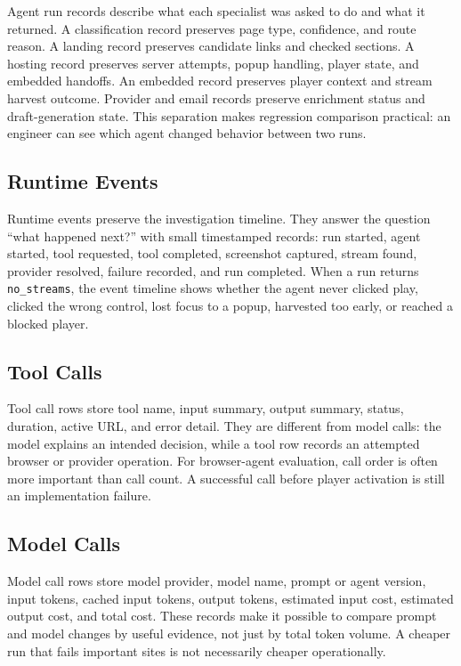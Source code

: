 Agent run records describe what each specialist was asked to do and what it
returned. A classification record preserves page type, confidence, and route
reason. A landing record preserves candidate links and checked sections. A
hosting record preserves server attempts, popup handling, player state, and
embedded handoffs. An embedded record preserves player context and stream
harvest outcome. Provider and email records preserve enrichment status and
draft-generation state. This separation makes regression comparison practical:
an engineer can see which agent changed behavior between two runs.

\subsection{Runtime Events}

Runtime events preserve the investigation timeline. They answer the question
``what happened next?'' with small timestamped records: run started, agent
started, tool requested, tool completed, screenshot captured, stream found,
provider resolved, failure recorded, and run completed. When a run returns
\texttt{no\_streams}, the event timeline shows whether the agent never clicked
play, clicked the wrong control, lost focus to a popup, harvested too early, or
reached a blocked player.

\subsection{Tool Calls}

Tool call rows store tool name, input summary, output summary, status,
duration, active URL, and error detail. They are different from model calls:
the model explains an intended decision, while a tool row records an attempted
browser or provider operation. For browser-agent evaluation, call order is often
more important than call count. A successful  call before
player activation is still an implementation failure.

\subsection{Model Calls}

Model call rows store model provider, model name, prompt or agent version,
input tokens, cached input tokens, output tokens, estimated input cost,
estimated output cost, and total cost. These records make it possible to
compare prompt and model changes by useful evidence, not just by total token
volume. A cheaper run that fails important sites is not necessarily cheaper
operationally.

